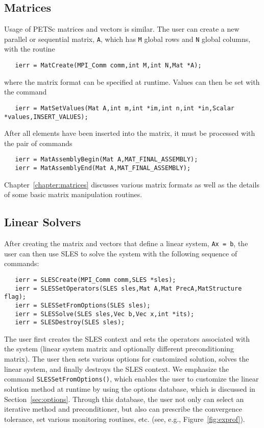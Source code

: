 {\subsection*{Matrices}

Usage of PETSc matrices and vectors is similar.  
The user can create a new parallel or sequential matrix, {\tt A}, which
has {\tt M} global rows and {\tt N} global columns, with the routine
\begin{verbatim}
   ierr = MatCreate(MPI_Comm comm,int M,int N,Mat *A);
\end{verbatim}
where the matrix format can be specified at runtime.
Values can then be set with the command
\begin{verbatim}
   ierr = MatSetValues(Mat A,int m,int *im,int n,int *in,Scalar *values,INSERT_VALUES);
\end{verbatim}
After  all elements have been inserted into the
matrix, it must be processed with the pair of commands
 
\begin{verbatim}
   ierr = MatAssemblyBegin(Mat A,MAT_FINAL_ASSEMBLY);
   ierr = MatAssemblyEnd(Mat A,MAT_FINAL_ASSEMBLY);
\end{verbatim}
Chapter~\ref{chapter:matrices} discusses various matrix formats as
well as the details of some basic matrix manipulation routines.

\subsection*{Linear Solvers}

After creating the matrix and vectors that define a linear system,
{\tt Ax = b}, the user can then use SLES to solve the system 
with the following sequence of commands: 
 
  
\begin{verbatim}
   ierr = SLESCreate(MPI_Comm comm,SLES *sles); 
   ierr = SLESSetOperators(SLES sles,Mat A,Mat PrecA,MatStructure flag);
   ierr = SLESSetFromOptions(SLES sles);
   ierr = SLESSolve(SLES sles,Vec b,Vec x,int *its);
   ierr = SLESDestroy(SLES sles);
\end{verbatim}
The user first creates the SLES context and sets the operators
associated with the system (linear system matrix and optionally different
preconditioning matrix).  The user then sets various options for
customized solution, solves the linear system, and finally destroys
the SLES context.  We emphasize the command {\tt SLESSetFromOptions()}, 
which enables the user to customize the linear solution
method at runtime by using the options database, which is discussed in
Section~\ref{sec:options}. Through this database, the user not only
can select an iterative method and preconditioner, but also can prescribe
the convergence tolerance, set various monitoring routines, etc.
(see, e.g., Figure~\ref{fig:exprof}).

}
